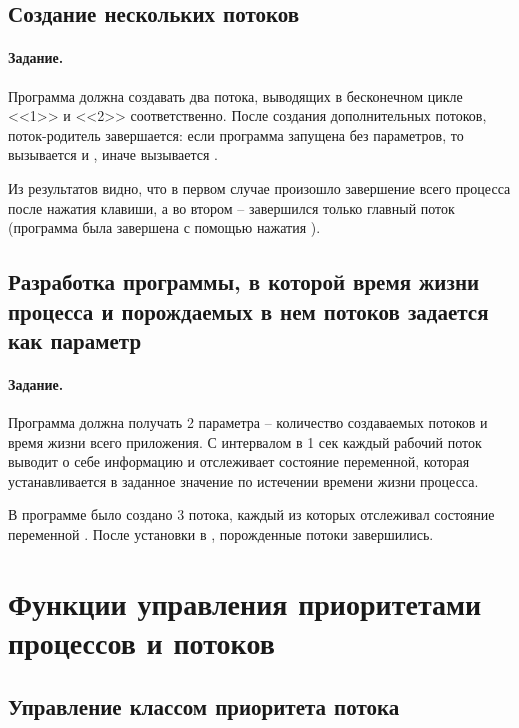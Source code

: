 \subsection{Создание нескольких потоков}

\paragraph{Задание.} Программа должна создавать два потока, выводящих в бесконечном цикле <<1>> и <<2>> соответственно. После создания дополнительных потоков, поток-родитель завершается: если программа запущена без параметров, то вызывается  и , иначе вызывается .


Из результатов видно, что в первом случае произошло завершение всего процесса после нажатия клавиши, а во втором -- завершился только главный поток (программа была завершена с помощью нажатия ).

\subsection{Разработка программы, в которой время жизни процесса и порождаемых в нем потоков задается как параметр}

\paragraph{Задание.} Программа должна получать 2 параметра -- количество создаваемых потоков и время жизни всего приложения. С интервалом в 1 сек каждый рабочий поток выводит о себе информацию и отслеживает состояние переменной, которая устанавливается в заданное значение по истечении времени жизни процесса.


В программе было создано 3 потока, каждый из которых отслеживал состояние переменной . После установки  в , порожденные потоки завершились.

\section{Функции управления приоритетами процессов и потоков}

\subsection{Управление классом приоритета потока}

